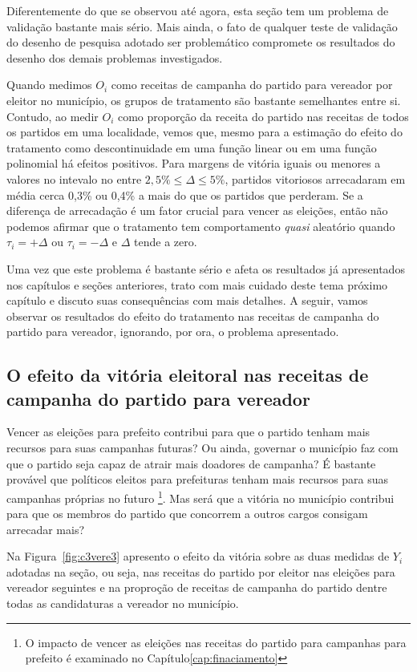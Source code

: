 Diferentemente do que se observou até agora, esta seção tem um problema de validação bastante mais sério. Mais ainda, o fato de qualquer teste de validação do desenho de pesquisa adotado ser problemático compromete os resultados do desenho dos demais problemas investigados.

Quando medimos $O_{i}$ como receitas de campanha do partido para vereador por eleitor no município, os grupos de tratamento são bastante semelhantes entre si. Contudo, ao medir $O_{i}$ como proporção da receita do partido nas receitas de todos os partidos em uma localidade, vemos que, mesmo para a estimação do efeito do tratamento como descontinuidade em uma função linear ou em uma função polinomial há efeitos positivos. Para margens de vitória iguais ou menores a valores no intevalo no entre $2,5\% \leq \Delta \leq 5\%$, partidos vitoriosos arrecadaram em média cerca 0,3\% ou 0,4\% a mais do que os partidos que perderam. Se a diferença de arrecadação é um fator crucial para vencer as eleições, então não podemos afirmar que o tratamento tem comportamento \textit{quasi} aleatório quando $\tau_{i}=+\Delta$ ou $\tau_{i}=-\Delta$ e $\Delta$ tende a zero.

Uma vez que este problema é bastante sério e afeta os resultados já apresentados nos capítulos e seções anteriores, trato com mais cuidado deste tema próximo capítulo e discuto suas consequências com mais detalhes. A seguir, vamos observar os resultados do efeito do tratamento nas receitas de campanha do partido para vereador, ignorando, por ora, o problema apresentado.

\subsection{O efeito da vitória eleitoral nas receitas de campanha do partido para vereador}

Vencer as eleições para prefeito contribui para que o partido tenham mais recursos para suas campanhas futuras? Ou ainda, governar o município faz com que o partido seja capaz de atrair mais doadores de campanha? É bastante provável que políticos eleitos para prefeituras tenham mais recursos para suas campanhas próprias no futuro \footnote{O impacto de vencer as eleições nas receitas do partido para campanhas para prefeito é examinado no Capítulo\ref{cap:finaciamento}}. Mas será que a vitória no município contribui para que os membros do partido que concorrem a outros cargos consigam arrecadar mais?

Na Figura~\ref{fig:c3vere3} apresento o efeito da vitória sobre as duas medidas de $Y_{i}$ adotadas na seção, ou seja, nas receitas do partido por eleitor nas eleições para vereador seguintes e na proproção de receitas de campanha do partido dentre todas as candidaturas a vereador no município.

